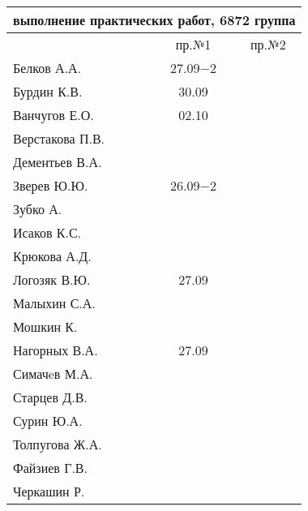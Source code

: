 \documentclass[a4paper,11pt]{article}
\begin{document}
\newpage
\begin{tabular}{l|cc}
\multicolumn{3}{c}{выполнение практических работ, 6872 группа} \\
\toprule
& пр.№1 & пр.№2 \\
\midrule
Белков А.А.    &27.09$-2$&     \\   
Бурдин К.В.    &30.09    &     \\
Ванчугов Е.О.  &02.10    &     \\
Верстакова П.В.&         &     \\
Дементьев В.А. &         &     \\
Зверев Ю.Ю.    &26.09$-2$&     \\
Зубко А.       &         &     \\
Исаков К.С.    &         &     \\
Крюкова А.Д.   &         &     \\
Логозяк В.Ю.   &27.09    &     \\
Малыхин С.А.   &         &     \\
Мошкин К.      &         &     \\
Нагорных В.А.  &27.09    &     \\
Симачeв М.А.   &         &     \\
Старцев Д.В.   &         &     \\
Сурин Ю.А.     &         &     \\
Толпугова Ж.А. &         &     \\
Файзиев Г.В.   &         &     \\
Черкашин Р.    &         &     \\
\bottomrule
\end{tabular}
\end{document}
